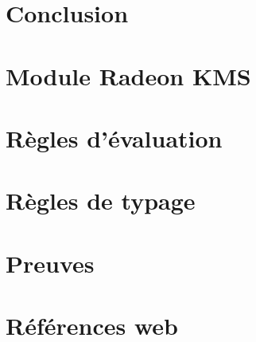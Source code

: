 \documentclass[a4paper,11pt]{memoir}
\begin{document}
\chapter{Conclusion}

\label{cha:conclusion}


\appendix
\renewcommand{\appendixpagename}{Annexes}
\renewcommand{\appendixtocname}{\appendixpagename}
\appendixpage*

\chapter{Module Radeon KMS}

\label{cha:code-noyau}


\chapter{Règles d'évaluation}



\chapter{Règles de typage}



\chapter{Preuves}




%

\backmatter{}


\clearpage{}

\listoffigures{}

\clearpage{}

\renewcommand{\listtheoremname}{Liste des définitions}
\listoftheorems[ignoreall,show={definition}]

\renewcommand{\listtheoremname}{Liste des théorèmes et propriétés}
\listoftheorems[ignoreall,show={theorem,lemma}]

\chapter{Références web}

\insertlinks{}






\end{document}
